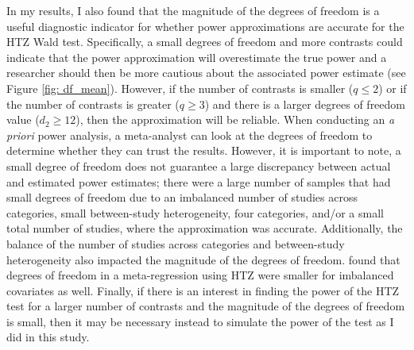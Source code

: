 In my results, I also found that the magnitude of the degrees of freedom is a useful diagnostic indicator for whether power approximations are accurate for the HTZ Wald test. Specifically, a small degrees of freedom and more contrasts could indicate that the power approximation will overestimate the true power and a researcher should then be more cautious about the associated power estimate (see Figure \ref{fig: df_mean}). However, if the number of contrasts is smaller ($q \leq 2$) or if the number of contrasts is greater ($q \geq 3$) and there is a larger degrees of freedom value ($d_2 \geq 12$), then the approximation will be reliable. When conducting an \textit{a priori} power analysis, a meta-analyst can look at the degrees of freedom to determine whether they can trust the results. However, it is important to note, a small degree of freedom does not guarantee a large discrepancy between actual and estimated power estimates; there were a large number of samples that had small degrees of freedom due to an imbalanced number of studies across categories, small between-study heterogeneity, four categories, and/or a small total number of studies, where the approximation was accurate. Additionally, the balance of the number of studies across categories and between-study heterogeneity also impacted the magnitude of the degrees of freedom. \textcite{tipton2015b} found that degrees of freedom in a meta-regression using HTZ were smaller for imbalanced covariates as well. Finally, if there is an interest in finding the power of the HTZ test for a larger number of contrasts and the magnitude of the degrees of freedom is small, then it may be necessary instead to simulate the power of the test as I did in this study. 

